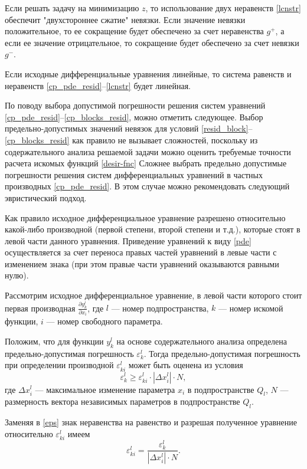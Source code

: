 \documentclass[a4paper,11pt,numreferences,mathsec,kaplist]{isuepsutf8}
\begin{document}
\begin{article}
Если решать задачу на минимизацию $z$, то использование двух
неравенств \eqref{lcnstr} обеспечит "двухстороннее сжатие" невязки.
Если значение невязки положительное, то ее сокращение будет обеспечено
за счет неравенства $g^{+}$, а если ее значение отрицательное, то
сокращение будет обеспечено за счет невязки $g^{-}$.

Если исходные дифференциальные уравнения линейные, то система равенств
и неравенств \eqref{cp_pde_resid}--\eqref{lcnstr} будет линейная.

По поводу выбора допустимой погрешности решения систем уравнений
\eqref{cp_pde_resid}--\eqref{cp_blocks_resid}, можно отметить
следующее. Выбор предельно-допустимых значений невязок для условий 
\eqref{resid_block}--\eqref{cp_blocks_resid} как правило не вызывает
сложностей, поскольку из содержательного анализа решаемой задачи можно 
оценить требуемые точности расчета искомых функций \eqref{desir-fnc}
Сложнее выбрать предельно допустимые погрешности решения систем
дифференциальных уравнений в частных производных \eqref{cp_pde_resid}.
В этом случае можно рекомендовать  следующий эвристический подход.

Как правило исходное дифференциальное уравнение разрешено относительно 
какой-либо производной (первой степени, второй степени и т.д.),
которые стоят в левой части данного уравнения. Приведение уравнений к
виду \eqref{pde} осуществляется за счет переноса правых частей
уравнений в левые части с изменением знака (при этом правые части
уравнений оказываются равными нулю).

Рассмотрим исходное дифференциальное уравнение, в левой части которого
стоит первая производная $\frac{\partial y^l_k}{\partial x_i}$, где
$l$ --- номер подпространства, $k$ --- номер искомой функции, $i$ ---
номер свободного параметра.

Положим, что для функции $y^l_k$ на основе содержательного анализа
определена предельно-допустимая погрешность $\varepsilon^l_k$. Тогда
предельно-допустимая погрешность при определении производной 
$\varepsilon^l_{ki}$ может быть оценена из условия
\begin{equation}
    \varepsilon^l_k \ge \varepsilon^l_{ki}\cdot \left| \Delta x^l_i
    \right| \cdot N,
    \label{eps}
\end{equation}
где $\Delta x^l_i$ --- максимальное изменение параметра $x_i$ в
подпространстве $Q_l$, $N$ --- размерность вектора независимых
параметров в подпространстве $Q_l$.

Заменяя в \eqref{eps} знак неравенства на равенство и разрешая
полученное уравнение относительно $\varepsilon^{l}_{ki}$ имеем
\begin{equation*}
    \varepsilon^{l}_{ki} = \frac{\varepsilon^l_k}{\left|\Delta x^l_i
    \right| \cdot N}.
\end{equation*}


\end{article}
\end{document}
